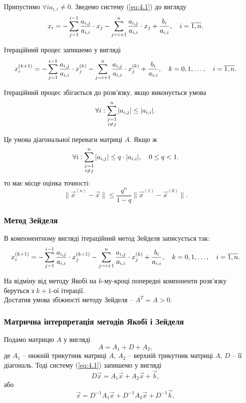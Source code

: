 Припустимо $\forall i a_{i,i} \ne 0$. Зведемо систему (\ref{eq:4.1}) до вигляду
\[ x_i = -\displaystyle\sum\limits_{j=1}^{i-1} \dfrac{a_{i,j}}{a_{i,i}} \cdot x_j - \displaystyle\sum\limits_{j=i+1}^n \dfrac{a_{i,j}}{a_{i,i}} \cdot x_j + \dfrac{b_i}{a_{i,i}}, \quad i=\overline{1,n}. \]

Ітераційний процес запишемо у вигляді
\begin{equation}
	\label{eq:4.8}
	x_i^{(k+1)} = -\displaystyle\sum\limits_{j=1}^{i-1} \dfrac{a_{i,j}}{a_{i,i}} \cdot x_j^{(k)} - \displaystyle\sum\limits_{j=i+1}^n \dfrac{a_{i,j}}{a_{i,i}} \cdot x_j^{(k)} + \dfrac{b_i}{a_{i,i}}, \quad k = 0,1,\ldots, \quad i=\overline{1,n}.
\end{equation}

Ітераційний процес збігається до розв’язку, якщо виконується умова
\[ \forall i: \displaystyle\sum\limits_{\substack{j = 1 \\ i \ne j}}^n |a_{i,j}| \le |a_{i,i}|. \]

Це умова діагональної переваги матриці $A$. Якщо ж
\begin{equation}
	\label{eq:4.9}
	\forall i: \displaystyle\sum\limits_{\substack{j = 1 \\ i \ne j}}^n |a_{i,j}| \le q\cdot|a_{i,i}|, \quad 0 \le q < 1.
\end{equation}
то має місце оцінка точності:
\[ \|\vec x^{(n)} - \vec x\| \le \dfrac{q^n}{1-q}\|\vec x^{(1)} - \vec x^{(0)}\|. \]

\subsubsection{Метод Зейделя}
В компонентному вигляді ітераційний метод Зейделя записується так:
\begin{equation}
	\label{eq:4.10}
	x_i^{(k+1)} = -\displaystyle\sum\limits_{j=1}^{i-1} \dfrac{a_{i,j}}{a_{i,i}} \cdot x_j^{(k+1)} - \displaystyle\sum\limits_{j=i+1}^n \dfrac{a_{i,j}}{a_{i,i}} \cdot x_j^{(k)} + \dfrac{b_i}{a_{i,i}}, \quad k = 0,1,\ldots, \quad i=\overline{1,n}.
\end{equation}

На відміну від методу Якобі на $k$-му-кроці попередні компоненти розв'язку беруться з $k+1$-ої ітерації. \\

Достатня умова збіжності методу Зейделя -- $A^T = A > 0$.

\subsubsection{Матрична інтерпретація методів Якобі і Зейделя}

Подамо матрицю $A$ у вигляді \[ A = A_1 + D + A_2, \]
де $A_1$ -- нижній трикутник матриці $A$, $A_2$ -- верхній трикутник матриці $A$, $D$ -- її
діагональ. Тоді систему (\ref{eq:4.1}) запишемо у вигляді \[ D \vec x = A_1 \vec x + A_2 \vec x + \vec b,\]
або
\[ \vec x = D^{-1} A_1 \vec x + D^{-1} A_2 \vec x + D^{-1} \vec b,\]
 
